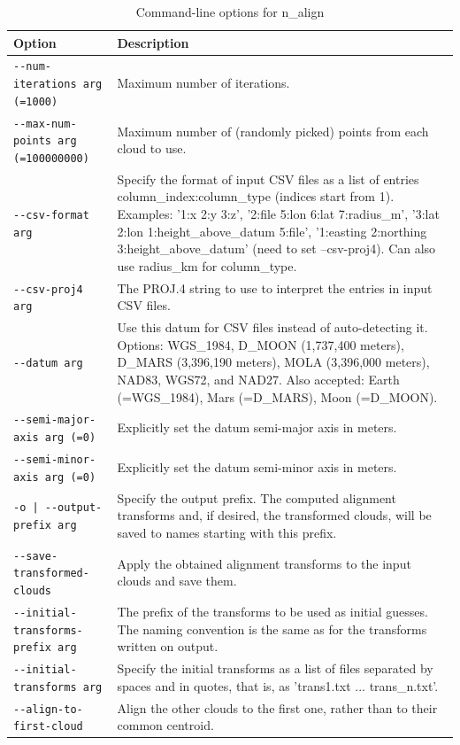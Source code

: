 \begin{longtable}{|l|p{7.5cm}|}
\caption{Command-line options for n\_align}
\label{tbl:nalign}
\endfirsthead
\endhead
\endfoot
\endlastfoot
\hline
Option & Description \\ \hline \hline
\texttt{-\/-num-iterations arg (=1000) } & Maximum number of iterations.\\ \hline
\texttt{-\/-max-num-points arg (=100000000) } & Maximum number of (randomly picked) points from each cloud to use.\\ \hline
\texttt{-\/-csv-format arg  } & Specify the format of input CSV files as a list of entries column\_index:column\_type (indices start from 1). Examples: '1:x 2:y 3:z', '2:file 5:lon 6:lat 7:radius\_m', '3:lat 2:lon 1:height\_above\_datum 5:file', '1:easting 2:northing 3:height\_above\_datum' (need to set --csv-proj4). Can also use radius\_km for column\_type.\\ \hline
\texttt{-\/-csv-proj4 arg  } & The PROJ.4 string to use to interpret the entries in input CSV files.\\ \hline
\texttt{-\/-datum arg  } & Use this datum for CSV files instead of auto-detecting it. Options: WGS\_1984, D\_MOON (1,737,400 meters), D\_MARS (3,396,190 meters), MOLA (3,396,000 meters), NAD83, WGS72, and NAD27. Also accepted: Earth (=WGS\_1984), Mars (=D\_MARS), Moon (=D\_MOON).\\ \hline
\texttt{-\/-semi-major-axis arg (=0) } & Explicitly set the datum semi-major axis in meters.\\ \hline
\texttt{-\/-semi-minor-axis arg (=0) } & Explicitly set the datum semi-minor axis in meters.\\ \hline
\texttt{-o | -\/-output-prefix  arg  } & Specify the output prefix. The computed alignment transforms and, if desired, the transformed clouds, will be saved to names starting with this prefix.\\ \hline
\texttt{-\/-save-transformed-clouds  } & Apply the obtained alignment transforms to the input clouds and save them.\\ \hline
\texttt{-\/-initial-transforms-prefix arg  } & The prefix of the transforms to be used as initial guesses. The naming convention is the same as for the transforms written on output.\\ \hline
\texttt{-\/-initial-transforms arg  } & Specify the initial transforms as a list of files separated by spaces and in quotes, that is, as 'trans1.txt ... trans\_n.txt'.\\ \hline
\texttt{-\/-align-to-first-cloud  } & Align the other clouds to the first one, rather than to their common centroid.\\ \hline

\end{longtable}
